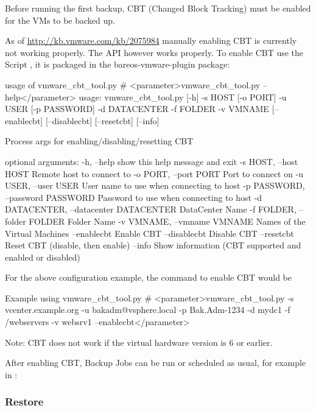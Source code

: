 Before running the first backup, CBT (Changed Block Tracking) must be
enabled for the VMs to be backed up.

As of \url{http://kb.vmware.com/kb/2075984} manually enabling CBT is
currently not working properly. The API however works properly.
To enable CBT use the Script , it is packaged
in the bareos-vmware-plugin package:

\begin{commands}{usage of vmware\_cbt\_tool.py}
# <parameter>vmware_cbt_tool.py --help</parameter>
usage: vmware_cbt_tool.py [-h] -s HOST [-o PORT] -u USER [-p PASSWORD] -d
                          DATACENTER -f FOLDER -v VMNAME [--enablecbt]
                          [--disablecbt] [--resetcbt] [--info]

Process args for enabling/disabling/resetting CBT

optional arguments:
  -h, --help            show this help message and exit
  -s HOST, --host HOST  Remote host to connect to
  -o PORT, --port PORT  Port to connect on
  -u USER, --user USER  User name to use when connecting to host
  -p PASSWORD, --password PASSWORD
                        Password to use when connecting to host
  -d DATACENTER, --datacenter DATACENTER
                        DataCenter Name
  -f FOLDER, --folder FOLDER
                        Folder Name
  -v VMNAME, --vmname VMNAME
                        Names of the Virtual Machines
  --enablecbt           Enable CBT
  --disablecbt          Disable CBT
  --resetcbt            Reset CBT (disable, then enable)
  --info                Show information (CBT supported and enabled or
                        disabled)
\end{commands}

For the above configuration example, the command to enable CBT would be

\begin{commands}{Example using vmware\_cbt\_tool.py}
# <parameter>vmware_cbt_tool.py -s vcenter.example.org -u bakadm@vsphere.local -p Bak.Adm-1234 -d mydc1 -f /webservers -v websrv1 --enablecbt</parameter>
\end{commands}

Note: CBT does not work if the virtual hardware version is 6 or earlier.

After enabling CBT, Backup Jobs can be run or scheduled as usual,
for example in :


\subsubsection{Restore}

